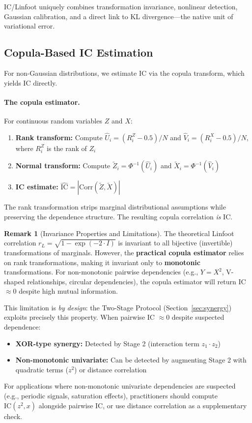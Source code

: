 \documentclass[10pt]{article} %
\theoremstyle{plain}
\theoremstyle{definition}
\newtheorem{remark}[theorem]{Remark}
\newcommand{\IC}{\mathrm{IC}}  %
\newcommand{\MI}{I}
\begin{document}
\noindent IC/Linfoot uniquely combines transformation invariance, nonlinear detection, Gaussian calibration, and a direct link to KL divergence---the native unit of variational error.

\subsection{Copula-Based IC Estimation}
\label{sec:copula}

For non-Gaussian distributions, we estimate IC via the copula transform, which yields IC directly.

\paragraph{The copula estimator.} For continuous random variables $Z$ and $X$:
\begin{enumerate}[nosep]
    \item \textbf{Rank transform:} Compute $\hat{U}_i = (R_i^Z - 0.5)/N$ and $\hat{V}_i = (R_i^X - 0.5)/N$, where $R_i^Z$ is the rank of $Z_i$
    \item \textbf{Normal transform:} Compute $\tilde{Z}_i = \Phi^{-1}(\hat{U}_i)$ and $\tilde{X}_i = \Phi^{-1}(\hat{V}_i)$
    \item \textbf{IC estimate:} $\widehat{\IC} = |\text{Corr}(\tilde{Z}, \tilde{X})|$
\end{enumerate}

The rank transformation strips marginal distributional assumptions while preserving the dependence structure. The resulting copula correlation \emph{is} IC.

\begin{remark}[Invariance Properties and Limitations]
\label{rem:monotonic-invariance}
The theoretical Linfoot correlation $r_L = \sqrt{1 - \exp(-2 \cdot \MI)}$ is invariant to all bijective (invertible) transformations of marginals. However, the \textbf{practical copula estimator} relies on rank transformations, making it invariant only to \textbf{monotonic} transformations. For non-monotonic pairwise dependencies (e.g., $Y = X^2$, V-shaped relationships, circular dependencies), the copula estimator will return IC $\approx 0$ despite high mutual information.

This limitation is \emph{by design}: the Two-Stage Protocol (Section~\ref{sec:synergy}) exploits precisely this property. When pairwise IC $\approx 0$ despite suspected dependence:
\begin{itemize}[nosep]
    \item \textbf{XOR-type synergy:} Detected by Stage 2 (interaction term $z_1 \cdot z_2$)
    \item \textbf{Non-monotonic univariate:} Can be detected by augmenting Stage 2 with quadratic terms ($z^2$) or distance correlation
\end{itemize}
For applications where non-monotonic univariate dependencies are suspected (e.g., periodic signals, saturation effects), practitioners should compute $\IC(z^2, x)$ alongside pairwise IC, or use distance correlation \citep{szekely2007measuring} as a supplementary check.
\end{remark}
\end{document}
